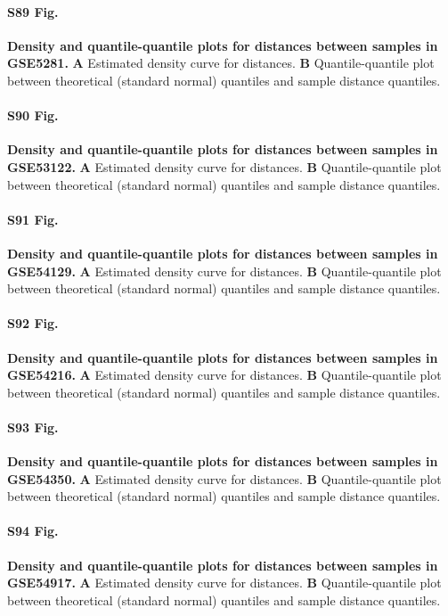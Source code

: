 \documentclass[10pt,letterpaper]{article}
\begin{document}
\paragraph*{S89 Fig.}
\hypertarget{S89_Fig}{
{\bf Density and quantile-quantile plots for distances between samples in GSE5281.} \textbf{A} Estimated density curve for distances. \textbf{B} Quantile-quantile plot between theoretical (standard normal) quantiles and sample distance quantiles.}

\paragraph*{S90 Fig.}
\hypertarget{S90_Fig}{
{\bf Density and quantile-quantile plots for distances between samples in GSE53122.} \textbf{A} Estimated density curve for distances. \textbf{B} Quantile-quantile plot between theoretical (standard normal) quantiles and sample distance quantiles.}

\paragraph*{S91 Fig.}
\hypertarget{S91_Fig}{
{\bf Density and quantile-quantile plots for distances between samples in GSE54129.} \textbf{A} Estimated density curve for distances. \textbf{B} Quantile-quantile plot between theoretical (standard normal) quantiles and sample distance quantiles.}

\paragraph*{S92 Fig.}
\hypertarget{S92_Fig}{
{\bf Density and quantile-quantile plots for distances between samples in GSE54216.} \textbf{A} Estimated density curve for distances. \textbf{B} Quantile-quantile plot between theoretical (standard normal) quantiles and sample distance quantiles.}

\paragraph*{S93 Fig.}
\hypertarget{S93_Fig}{
{\bf Density and quantile-quantile plots for distances between samples in GSE54350.} \textbf{A} Estimated density curve for distances. \textbf{B} Quantile-quantile plot between theoretical (standard normal) quantiles and sample distance quantiles.}

\paragraph*{S94 Fig.}
\hypertarget{S94_Fig}{
{\bf Density and quantile-quantile plots for distances between samples in GSE54917.} \textbf{A} Estimated density curve for distances. \textbf{B} Quantile-quantile plot between theoretical (standard normal) quantiles and sample distance quantiles.}
\end{document}
